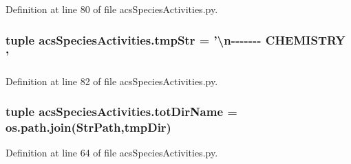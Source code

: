 Definition at line 80 of file acs\-Species\-Activities.\-py.

\hypertarget{a00103_a81ab8133517c53adfcdf8129e24cf5d0}{
\subsubsection[{tmp\-Str}]{\setlength{\rightskip}{0pt plus 5cm}tuple acs\-Species\-Activities.\-tmp\-Str = '\textbackslash{}n-\/-\/-\/-\/-\/-\/-\/ C\-H\-E\-M\-I\-S\-T\-R\-Y '}}\label{a00103_a81ab8133517c53adfcdf8129e24cf5d0}


Definition at line 82 of file acs\-Species\-Activities.\-py.

\hypertarget{a00103_aa71c948cf1d0699207eafcd30beb394e}{
\subsubsection[{tot\-Dir\-Name}]{\setlength{\rightskip}{0pt plus 5cm}tuple acs\-Species\-Activities.\-tot\-Dir\-Name = os.\-path.\-join({\bf Str\-Path},tmp\-Dir)}}\label{a00103_aa71c948cf1d0699207eafcd30beb394e}


Definition at line 64 of file acs\-Species\-Activities.\-py.

